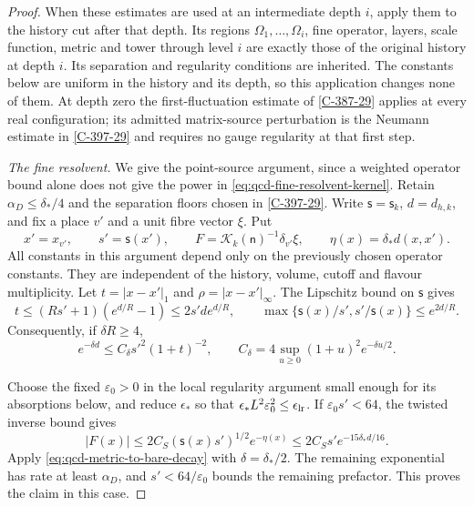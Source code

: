 \documentclass[11pt,letterpaper,reqno]{amsart}
\theoremstyle{definition}
\theoremstyle{remark}
\begin{document}
\begin{proof}
When these estimates are used at an intermediate depth $i$,
apply them to the history cut after that depth.  Its regions
$\Omega_1,\ldots,\Omega_i$, fine operator, layers, scale function,
metric and tower through level $i$ are exactly those of the
original history at depth $i$.  Its separation and regularity
conditions are inherited.  The constants below are uniform in
the history and its depth, so this application changes none of
them.  At depth zero the first-fluctuation estimate of
\cref{C-387-29} applies at every real configuration; its admitted
matrix-source perturbation is the Neumann estimate in
\cref{C-397-29} and requires no gauge regularity at that first step.

\emph{The fine resolvent.}
We give the point-source argument, since a weighted operator
bound alone does not give the power in
\eqref{eq:qcd-fine-resolvent-kernel}. Retain
$\alpha_D\le\delta_*/4$ and the separation floors chosen in
\cref{C-397-29}. Write $\mathsf s=\mathsf s_k$, $d=d_{h,k}$,
and fix a place $v'$ and a unit fibre vector $\xi$. Put
\[
 x'=x_{v'},\qquad s'=\mathsf s(x'),\qquad
 F=\mathcal K_k(\mathsf n)^{-1}\delta_{v'}\xi,
 \qquad \eta(x)=\delta_*d(x,x').
\]
All constants in this argument depend only on the previously
chosen operator constants. They are independent of the history,
volume, cutoff and flavour multiplicity. Let
$t=|x-x'|_1$ and $\rho=|x-x'|_\infty$. The Lipschitz bound
on $\mathsf s$ gives
\[
 t\le(Rs'+1)(e^{d/R}-1)\le2s'de^{d/R},\qquad
 \max\{\mathsf s(x)/s',s'/\mathsf s(x)\}\le e^{2d/R}.
\]
Consequently, if $\delta R\ge4$,
\begin{equation}\label{eq:qcd-metric-to-bare-decay}
 e^{-\delta d}\le C_\delta s'^2(1+t)^{-2},\qquad
 C_\delta=4\sup_{u\ge0}(1+u)^2e^{-\delta u/2}.
\end{equation}

Choose the fixed $\varepsilon_0>0$ in the local regularity
argument small enough for its absorptions below, and reduce
$\epsilon_*$ so that
$\epsilon_*L^2\varepsilon_0^2\le\epsilon_{\rm lr}$.
If
$\varepsilon_0s'<64$, the twisted inverse bound gives
\[
 |F(x)|\le2C_S(\mathsf s(x)s')^{1/2}e^{-\eta(x)}
       \le2C_Ss'e^{-15\delta_*d/16}.
\]
Apply \eqref{eq:qcd-metric-to-bare-decay} with
$\delta=\delta_*/2$. The remaining exponential has rate
at least $\alpha_D$, and $s'<64/\varepsilon_0$ bounds
the remaining prefactor. This proves the claim in this case.


\end{proof}
\end{document}
